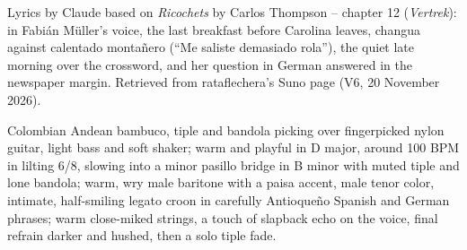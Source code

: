 
\begin{notes}
Lyrics by Claude based on \emph{Ricochets} by Carlos Thompson -- chapter 12 (\emph{Vertrek}): in Fabián Müller's voice, the last breakfast before Carolina leaves, changua against calentado montañero (``Me saliste demasiado rola''), the quiet late morning over the crossword, and her question in German answered in the newspaper margin. Retrieved from rataflechera's Suno page (V6, 20 November 2026).
\end{notes}
\begin{style}
Colombian Andean bambuco, tiple and bandola picking over fingerpicked nylon guitar, light bass and soft shaker; warm and playful in D major, around 100 BPM in lilting 6/8, slowing into a minor pasillo bridge in B minor with muted tiple and lone bandola; warm, wry male baritone with a paisa accent, male tenor color, intimate, half-smiling legato croon in carefully Antioqueño Spanish and German phrases; warm close-miked strings, a touch of slapback echo on the voice, final refrain darker and hushed, then a solo tiple fade.
\end{style}
